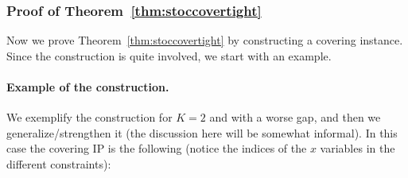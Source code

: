 \documentclass[smallextended]{svjour3}
\begin{document}
\subsubsection{Proof of Theorem~\ref{thm:stoccovertight}}

Now we prove Theorem~\ref{thm:stoccovertight} by constructing a covering instance. Since the construction is quite involved, we start with an example.

\paragraph{Example of the construction.} We exemplify the construction for $K = 2$ and with a worse gap, and then we generalize/strengthen it (the discussion here will be somewhat informal). In this case the covering IP is the following (notice the indices of the $x$ variables in the different constraints):
\end{document}
